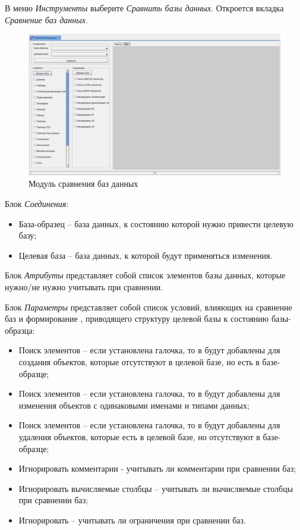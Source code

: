 В меню \textit{Инструменты} выберите \textit{Сравнить базы данных}. Откроется вкладка \textit{Сравнение баз данных}.

\begin{figure}[H]
	\centering
	\includegraphics[width = 1\linewidth]{img/compareDB_module.png}
	\caption{Модуль сравнения баз данных}
\end{figure}

Блок \textit{Соединения}:
\begin{itemize}
	\item База-образец -- база данных, к состоянию которой нужно привести целевую базу;
	\item Целевая база -- база данных, к которой будут применяться изменения.
\end{itemize}	

Блок \textit{Атрибуты} представляет собой список элементов базы данных, которые нужно/не нужно учитывать при сравнении.

Блок \textit{Параметры} представляет собой список условий, влияющих на сравнение баз и формирование , приводящего структуру целевой базы к состоянию базы-образца:
\begin{itemize}
	\item Поиск  элементов -- если установлена галочка, то в  будут добавлены  для создания объектов, которые отсутствуют в целевой базе, но есть в базе-образце;
	\item Поиск  элементов -- если установлена галочка, то в  будут добавлены  для изменения объектов с одинаковыми именами и типами данных;
	\item Поиск  элементов -- если установлена галочка, то в  будут добавлены  для удаления объектов, которые есть в целевой базе, но отсутствуют в базе-образце;
	\item Игнорировать комментарии - учитывать ли комментарии при сравнении баз;
	\item Игнорировать вычисляемые столбцы -- учитывать ли вычисляемые столбцы при сравнении баз; 
	\item Игнорировать  -- учитывать ли ограничения при сравнении баз.
\end{itemize}

